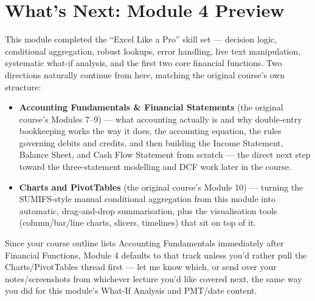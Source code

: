 \documentclass[11pt,a4paper]{article}
\begin{document}
\section{What's Next: Module 4 Preview}

This module completed the ``Excel Like a Pro'' skill set --- decision logic, conditional aggregation, robust lookups, error handling, live text manipulation, systematic what-if analysis, and the first two core financial functions. Two directions naturally continue from here, matching the original course's own structure:

\begin{itemize}
  \item \textbf{Accounting Fundamentals \& Financial Statements} (the original course's Modules 7--9) --- what accounting actually is and why double-entry bookkeeping works the way it does, the accounting equation, the rules governing debits and credits, and then building the Income Statement, Balance Sheet, and Cash Flow Statement from scratch --- the direct next step toward the three-statement modelling and DCF work later in the course.
  \item \textbf{Charts and PivotTables} (the original course's Module 10) --- turning the SUMIFS-style manual conditional aggregation from this module into automatic, drag-and-drop summarisation, plus the visualisation tools (column/bar/line charts, slicers, timelines) that sit on top of it.
\end{itemize}

Since your course outline lists Accounting Fundamentals immediately after Financial Functions, Module 4 defaults to that track unless you'd rather pull the Charts/PivotTables thread first --- let me know which, or send over your notes/screenshots from whichever lecture you'd like covered next, the same way you did for this module's What-If Analysis and PMT/date content.
\end{document}
